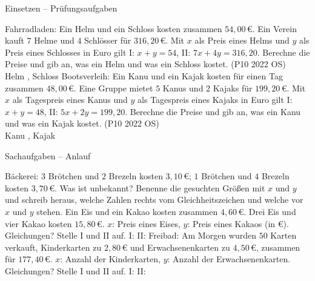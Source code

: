 \begin{aufgabe}{Einsetzen – Prüfungsaufgaben}
\begin{teile}
\steil Fahrradladen: Ein Helm und ein Schloss kosten zusammen $54{,}00\,€$. Ein Verein kauft $7$ Helme und $4$ Schlösser für $316{,}20\,€$. Mit $x$ als Preis eines Helms und $y$ als Preis eines Schlosses in Euro gilt I: $x + y = 54$, II: $7x + 4y = 316{,}20$. Berechne die Preise und gib an, was ein Helm und was ein Schloss kostet. \hfill (P10 2022 OS) \\ Helm \leerfeld[€] , Schloss \leerfeld[€]
\steil Bootsverleih: Ein Kanu und ein Kajak kosten für einen Tag zusammen $48{,}00\,€$. Eine Gruppe mietet $5$ Kanus und $2$ Kajaks für $199{,}20\,€$. Mit $x$ als Tagespreis eines Kanus und $y$ als Tagespreis eines Kajaks in Euro gilt I: $x + y = 48$, II: $5x + 2y = 199{,}20$. Berechne die Preise und gib an, was ein Kanu und was ein Kajak kostet. \hfill (P10 2022 OS) \\ Kanu \leerfeld[€] , Kajak \leerfeld[€]
\end{teile}
\end{aufgabe}

\begin{aufgabe}{Sachaufgaben – Anlauf}
\begin{teile}
\teil Bäckerei: $3$ Brötchen und $2$ Brezeln kosten $3{,}10\,€$; $1$ Brötchen und $4$ Brezeln kosten $3{,}70\,€$. Was ist unbekannt? Benenne die gesuchten Größen mit $x$ und $y$ und schreib heraus, welche Zahlen rechts vom Gleichheitszeichen und welche vor $x$ und $y$ stehen.
\teil Ein Eis und ein Kakao kosten zusammen $4{,}60\,€$. Drei Eis und vier Kakao kosten $15{,}80\,€$. $x$: Preis eines Eises, $y$: Preis eines Kakaos (in €). Gleichungen? Stelle I und II auf. I: \leerfeld \quad II: \leerfeld
\teil Freibad: Am Morgen wurden $50$ Karten verkauft, Kinderkarten zu $2{,}80\,€$ und Erwachsenenkarten zu $4{,}50\,€$, zusammen für $177{,}40\,€$. $x$: Anzahl der Kinderkarten, $y$: Anzahl der Erwachsenenkarten. Gleichungen? Stelle I und II auf. I: \leerfeld \quad II: \leerfeld
\end{teile}
\end{aufgabe}

